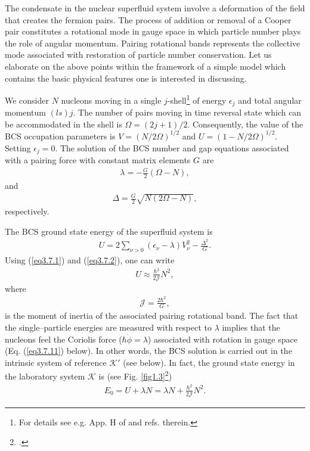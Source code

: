 The condensate in the nuclear superfluid system involve a deformation of the field that creates the fermion pairs. The process of addition or removal of a Cooper pair constitutes a rotational mode in gauge space in which particle number plays the role of angular momentum. Pairing rotational bands represents the collective mode associated with restoration of particle number conservation.
Let us elaborate on the above points within the framework of a simple model which contains the basic physical features one is interested in discussing.


We consider $N$ nucleons moving in a single $j$-shell\footnote{For details see e.g. App. H of \cite{Brink:05} and refs. therein.} of energy $\epsilon_j$ and total angular momentum $(ls)j$. The number of pairs moving in time reversal state which can be accommodated in the shell is $\Omega=(2j+1)/2$. Consequently, the value of the BCS occupation parameters is $V=(N/2\Omega)^{1/2}$ and $U=(1-N/2\Omega)^{1/2}$. Setting $\epsilon_j=0$. The solution of the BCS number and gap equations associated with a pairing force with constant matrix elements $G$ are
  \begin{align}\label{eq3.7.1}
  \lambda=-\frac{G}{2}(\Omega-N),
  \end{align}
  and
  \begin{align}\label{eq3.7.2}
\Delta=\frac{G}{2}\sqrt{N(2\Omega-N)},
  \end{align}
respectively.


The BCS ground state energy of the superfluid system is
  \begin{align}\label{eq3.7.3}
U=2\sum_{\nu>0}(\epsilon_\nu-\lambda)V^2_\nu-\frac{\Delta^2}{G}.
  \end{align}
Using (\ref{eq3.7.1}) and (\ref{eq3.7.2}), one can write
  \begin{align}\label{eq3.7.4}
U\approx\frac{\hbar^2}{2\mathcal J}N^2,  
    \end{align}
where
  \begin{align}\label{eq3.7.5}
\mathcal J=\frac{2\hbar^2}{G},  
    \end{align}
is the moment of inertia of the associated pairing rotational band. The fact that the single--particle energies are measured with respect to $\lambda$ implies that the nucleons feel the Coriolis force ($\hbar\dot{\phi}=\lambda$) associated with rotation in gauge space (Eq. (\ref{eq3.7.11}) below). In other words, the BCS solution is carried out in the intrinsic system of reference $\mathcal K'$ (see below). In fact, the ground state energy in the laboratory system $\mathcal K$ is (see Fig. \ref{fig1.3}\footnote{\cite{Broglia:00}.})
  \begin{align}\label{eq3.7.6}
E_0=U+\lambda N=\lambda N+\frac{\hbar^2}{2\mathcal J}N^2.
    \end{align}















